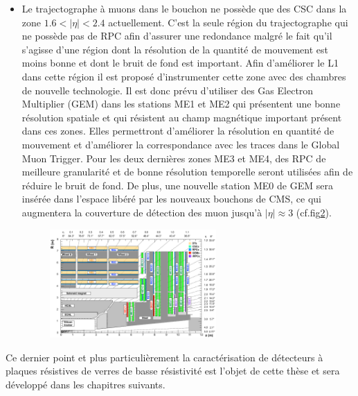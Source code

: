 \begin{itemize}[label=$\bullet$]
\begin{figure}[ht!]
		\label{L1_2}
	\end{figure}
\item Le trajectographe à muons dans le bouchon ne possède que des CSC dans la zone $1.6<|\eta|<2.4$ actuellement. C'est la seule région du trajectographe qui ne possède pas de RPC afin d'assurer une redondance malgré le fait qu'il s'agisse d'une région dont la résolution de la quantité de mouvement est moins bonne et dont le bruit de fond est important. Afin d'améliorer le L1 dans cette région il est proposé d'instrumenter cette zone avec des chambres de nouvelle technologie. Il est donc prévu d'utiliser des Gas Electron Multiplier (GEM) dans les stations ME1 et ME2 qui présentent une bonne résolution spatiale et qui résistent au champ magnétique important présent dans ces zones. Elles permettront d'améliorer la résolution en quantité de mouvement et d'améliorer la correspondance avec les traces dans le Global Muon Trigger. Pour les deux dernières zones ME3 et ME4, des RPC de meilleure granularité et de bonne résolution temporelle seront utilisées afin de réduire le bruit de fond.  De plus, une nouvelle station ME0 de GEM sera insérée dans l'espace libéré par les nouveaux bouchons de CMS, ce qui augmentera la couverture de détection des muon jusqu'à $|\eta|\approx3$ (cf.fig\ref{end}). 
	\begin{figure}[ht!]
	\centering
	\includegraphics[width=0.60\textwidth]{CMS/endcap.png}
	\label{end}
\end{figure}
\end{itemize}
Ce dernier point et plus particulièrement la caractérisation de détecteurs à plaques résistives de verres de basse résistivité est l'objet de cette thèse et sera développé dans les chapitres suivants.